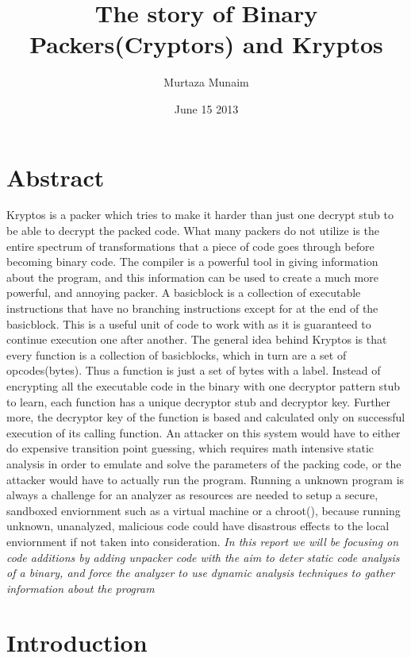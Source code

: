 \documentclass{article}
\title{The story of Binary Packers(Cryptors) and Kryptos}
\author{Murtaza Munaim}
\date{June 15 2013}
\begin{document}
\maketitle

\section{Abstract}

Kryptos is a packer which tries to make it harder than just one decrypt stub to be able to decrypt the packed code. What many packers do not utilize is the entire spectrum of transformations that a piece of code goes through before becoming binary code. The compiler is a powerful tool in giving information about the program, and this information can be used to create a much more powerful, and annoying packer. A basicblock is a collection of executable instructions that have no branching instructions except for at the end of the basicblock. This is a useful unit of code to work with as it is guaranteed to continue execution one after another. The general idea behind Kryptos is that every function is a collection of basicblocks, which in turn are a set of opcodes(bytes). Thus a function is just a set of bytes with a label. Instead of encrypting all the executable code in the binary with one decryptor pattern stub to learn, each function has a unique decryptor stub and decryptor key. Further more, the decryptor key of the function is based and calculated only on successful execution of its calling function. An attacker on this system would have to either do expensive transition point guessing, which requires math intensive static analysis in order to emulate and solve the parameters of the packing code, or the attacker would have to actually run the program. Running a unknown program is always a challenge for an analyzer as resources are needed to setup a secure, sandboxed enviornment such as a virtual machine or a chroot(), because running unknown, unanalyzed, malicious code could have disastrous effects to the local enviornment if not taken into consideration. \textit{In this report we will be focusing on code additions by adding unpacker code with the aim to deter static code analysis of a binary, and force the analyzer to use dynamic analysis techniques to gather information about the program}  \newline


\section {Introduction}
\end{document}
